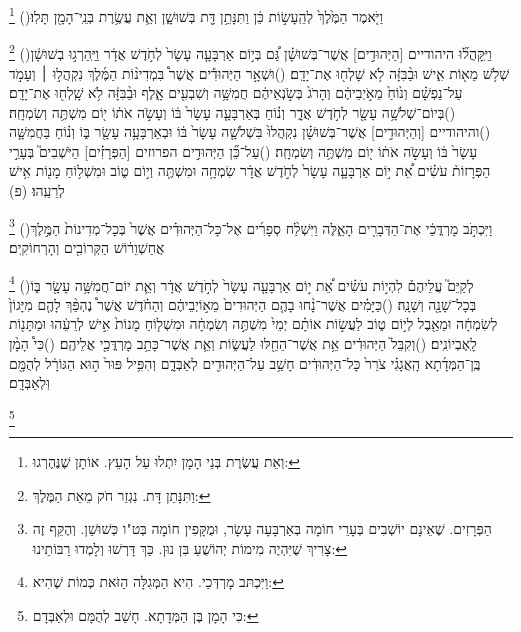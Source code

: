 \documentclass[12pt, openany]{book}
\newcommand{\footnotecomment}[1]{
	\renewcommand\thefootnote{}
	\footnote{#1}}
\newcommand{\commenta}[1]{\footnotecomment{#1}\hspace{0em}}
\newcommand{\vsnum}[1]{(\hebrewnumeral{#1})\space}
\begin{document}
{\commenta{וְאֵת עֲשֶׂרֶת בְּנֵי הָמָן יִתְלוּ עַל הָעֵץ. אוֹתָן שֶׁנֶּהֶרְגוּ:}%
\vsnum{14}וַיֹּ֤אמֶר הַמֶּ֙לֶךְ֙ לְהֵֽעָשׂ֣וֹת כֵּ֔ן וַתִּנָּתֵ֥ן דָּ֖ת בְּשׁוּשָׁ֑ן וְאֵ֛ת עֲשֶׂ֥רֶת בְּנֵֽי־הָמָ֖ן תָּלֽוּ׃%
\commenta{וַתִּנָּתֵן דָּת. נִגְזַר חֹק מֵאֵת הַמֶּלֶךְ:}%
\vsnum{15}וַיִּֽקָּהֲל֞וּ היהודיים [הַיְּהוּדִ֣ים] אֲשֶׁר־בְּשׁוּשָׁ֗ן גַּ֠ם בְּי֣וֹם אַרְבָּעָ֤ה עָשָׂר֙ לְחֹ֣דֶשׁ אֲדָ֔ר וַיַּֽהַרְג֣וּ בְשׁוּשָׁ֔ן שְׁלֹ֥שׁ מֵא֖וֹת אִ֑ישׁ וּבַ֨בִּזָּ֔ה לֹ֥א שָׁלְח֖וּ אֶת־יָדָֽם׃
\vsnum{16}וּשְׁאָ֣ר הַיְּהוּדִ֡ים אֲשֶׁר֩ בִּמְדִינ֨וֹת הַמֶּ֜לֶךְ נִקְהֲל֣וּ ׀ וְעָמֹ֣ד עַל־נַפְשָׁ֗ם וְנ֙וֹחַ֙ מֵאֹ֣יְבֵיהֶ֔ם וְהָרֹג֙ בְּשֹׂ֣נְאֵיהֶ֔ם חֲמִשָּׁ֥ה וְשִׁבְעִ֖ים אָ֑לֶף וּבַ֨בִּזָּ֔ה לֹ֥א שָֽׁלְח֖וּ אֶת־יָדָֽם׃
\vsnum{17}בְּיוֹם־שְׁלֹשָׁ֥ה עָשָׂ֖ר לְחֹ֣דֶשׁ אֲדָ֑ר וְנ֗וֹחַ בְּאַרְבָּעָ֤ה עָשָׂר֙ בּ֔וֹ וְעָשֹׂ֣ה אֹת֔וֹ י֖וֹם מִשְׁתֶּ֥ה וְשִׂמְחָֽה׃
\vsnum{18}והיהודיים [וְהַיְּהוּדִ֣ים] אֲשֶׁר־בְּשׁוּשָׁ֗ן נִקְהֲלוּ֙ בִּשְׁלֹשָׁ֤ה עָשָׂר֙ בּ֔וֹ וּבְאַרְבָּעָ֥ה עָשָׂ֖ר בּ֑וֹ וְנ֗וֹחַ בַּחֲמִשָּׁ֤ה עָשָׂר֙ בּ֔וֹ וְעָשֹׂ֣ה אֹת֔וֹ י֖וֹם מִשְׁתֶּ֥ה וְשִׂמְחָֽה׃
\vsnum{19}עַל־כֵּ֞ן הַיְּהוּדִ֣ים הפרוזים [הַפְּרָזִ֗ים] הַיֹּשְׁבִים֮ בְּעָרֵ֣י הַפְּרָזוֹת֒ עֹשִׂ֗ים אֵ֠ת י֣וֹם אַרְבָּעָ֤ה עָשָׂר֙ לְחֹ֣דֶשׁ אֲדָ֔ר שִׂמְחָ֥ה וּמִשְׁתֶּ֖ה וְי֣וֹם ט֑וֹב וּמִשְׁל֥וֹחַ מָנ֖וֹת אִ֥ישׁ לְרֵעֵֽהוּ׃ (פ)%
\commenta{הַפְּרָזִים. שֶׁאֵינָם יוֹשְׁבִים בְּעָרֵי חוֹמָה בְּאַרְבָּעָה עָשָׂר, וּמֻקָּפִין חוֹמָה בְּט"ו כְּשׁוּשַׁן. וְהֶקֵּף זֶה צָרִיךְ שֶׁיִּהְיֶה מִימוֹת יְהוֹשֻׁעַ בִּן נוּן. כַּךְ דָּרְשׁוּ וְלָמְדוּ רַבּוֹתֵינוּ: }%
\vsnum{20}וַיִּכְתֹּ֣ב מָרְדֳּכַ֔י אֶת־הַדְּבָרִ֖ים הָאֵ֑לֶּה וַיִּשְׁלַ֨ח סְפָרִ֜ים אֶל־כָּל־הַיְּהוּדִ֗ים אֲשֶׁר֙ בְּכָל־מְדִינוֹת֙ הַמֶּ֣לֶךְ אֲחַשְׁוֵר֔וֹשׁ הַקְּרוֹבִ֖ים וְהָרְחוֹקִֽים׃%
\commenta{וַיִּכְתּב מָרְדְּכַי. הִיא הַמְּגִלָּה הַזֹּאת כְּמוֹת שֶׁהִיא:}%
\vsnum{21}לְקַיֵּם֮ עֲלֵיהֶם֒ לִהְי֣וֹת עֹשִׂ֗ים אֵ֠ת י֣וֹם אַרְבָּעָ֤ה עָשָׂר֙ לְחֹ֣דֶשׁ אֲדָ֔ר וְאֵ֛ת יוֹם־חֲמִשָּׁ֥ה עָשָׂ֖ר בּ֑וֹ בְּכָל־שָׁנָ֖ה וְשָׁנָֽה׃
\vsnum{22}כַּיָּמִ֗ים אֲשֶׁר־נָ֨חוּ בָהֶ֤ם הַיְּהוּדִים֙ מֵא֣וֹיְבֵיהֶ֔ם וְהַחֹ֗דֶשׁ אֲשֶׁר֩ נֶהְפַּ֨ךְ לָהֶ֤ם מִיָּגוֹן֙ לְשִׂמְחָ֔ה וּמֵאֵ֖בֶל לְי֣וֹם ט֑וֹב לַעֲשׂ֣וֹת אוֹתָ֗ם יְמֵי֙ מִשְׁתֶּ֣ה וְשִׂמְחָ֔ה וּמִשְׁל֤וֹחַ מָנוֹת֙ אִ֣ישׁ לְרֵעֵ֔הוּ וּמַתָּנ֖וֹת לָֽאֶבְיוֹנִֽים׃
\vsnum{23}וְקִבֵּל֙ הַיְּהוּדִ֔ים אֵ֥ת אֲשֶׁר־הֵחֵ֖לּוּ לַעֲשׂ֑וֹת וְאֵ֛ת אֲשֶׁר־כָּתַ֥ב מָרְדֳּכַ֖י אֲלֵיהֶֽם׃
\vsnum{24}כִּי֩ הָמָ֨ן בֶּֽן־הַמְּדָ֜תָא הָֽאֲגָגִ֗י צֹרֵר֙ כָּל־הַיְּהוּדִ֔ים חָשַׁ֥ב עַל־הַיְּהוּדִ֖ים לְאַבְּדָ֑ם וְהִפִּ֥יל פּוּר֙ ה֣וּא הַגּוֹרָ֔ל לְהֻמָּ֖ם וּֽלְאַבְּדָֽם׃%
\commenta{כִּי הָמָן בֶּן הַמְּדָתָא. חָשַׁב לְהֻמָּם וּלְאַבְּדָם:}%
}
\end{document}

